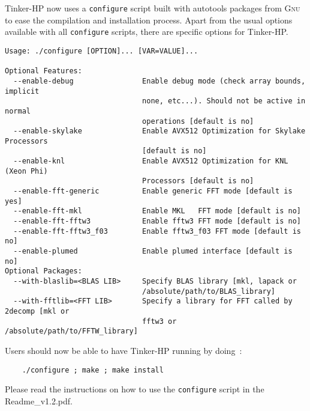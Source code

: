 \documentclass[]{article}
\begin{document}
Tinker-HP now uses a \texttt{configure} script built with  autotools packages from \textsc{Gnu} to ease the compilation and installation process. Apart from the usual options available with all \texttt{configure} scripts, there are specific options for Tinker-HP.


\begin{verbatim}
Usage: ./configure [OPTION]... [VAR=VALUE]...

Optional Features:
  --enable-debug                Enable debug mode (check array bounds, implicit
                                none, etc...). Should not be active in normal
                                operations [default is no]
  --enable-skylake              Enable AVX512 Optimization for Skylake Processors
                                [default is no]
  --enable-knl                  Enable AVX512 Optimization for KNL (Xeon Phi)
                                Processors [default is no]
  --enable-fft-generic          Enable generic FFT mode [default is yes]
  --enable-fft-mkl              Enable MKL   FFT mode [default is no]
  --enable-fft-fftw3            Enable fftw3 FFT mode [default is no]
  --enable-fft-fftw3_f03        Enable fftw3_f03 FFT mode [default is no]
  --enable-plumed               Enable plumed interface [default is no]
Optional Packages:
  --with-blaslib=<BLAS LIB>     Specify BLAS library [mkl, lapack or 
                                /absolute/path/to/BLAS_library]
  --with-fftlib=<FFT LIB>       Specify a library for FFT called by 2decomp [mkl or
                                fftw3 or /absolute/path/to/FFTW_library]
\end{verbatim}


Users should now be able to have Tinker-HP running by doing~:
\begin{verbatim}
    ./configure ; make ; make install
\end{verbatim}

Please read the instructions on how to use the \texttt{configure} script in the Readme\_v1.2.pdf.
\end{document}
